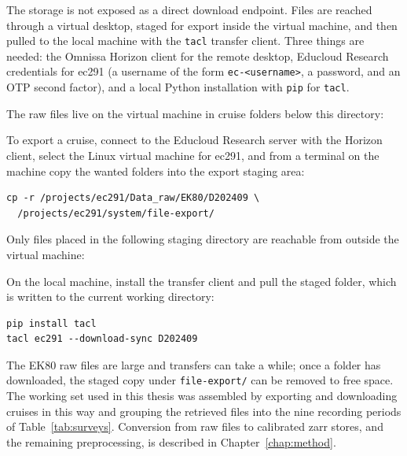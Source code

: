 The storage is not exposed as a direct download endpoint. Files are reached through a virtual desktop, staged for export inside the virtual machine, and then pulled to the local machine with the \texttt{tacl} transfer client. Three things are needed: the Omnissa Horizon client for the remote desktop, Educloud Research credentials for ec291 (a username of the form \texttt{ec-<username>}, a password, and an OTP second factor), and a local Python installation with \texttt{pip} for \texttt{tacl}.

The raw files live on the virtual machine in cruise folders below this directory:
\begin{center}
\end{center}
To export a cruise, connect to the Educloud Research server with the Horizon client, select the Linux virtual machine for ec291, and from a terminal on the machine copy the wanted folders into the export staging area:

\begin{verbatim}
cp -r /projects/ec291/Data_raw/EK80/D202409 \
  /projects/ec291/system/file-export/
\end{verbatim}

Only files placed in the following staging directory are reachable from outside the virtual machine:
\begin{center}
\end{center}
On the local machine, install the transfer client and pull the staged folder, which is written to the current working directory:

\begin{verbatim}
pip install tacl
tacl ec291 --download-sync D202409
\end{verbatim}

The EK80 raw files are large and transfers can take a while; once a folder has downloaded, the staged copy under \texttt{file-export/} can be removed to free space. The working set used in this thesis was assembled by exporting and downloading cruises in this way and grouping the retrieved files into the nine recording periods of Table~\ref{tab:surveys}. Conversion from raw files to calibrated zarr stores, and the remaining preprocessing, is described in Chapter~\ref{chap:method}.



